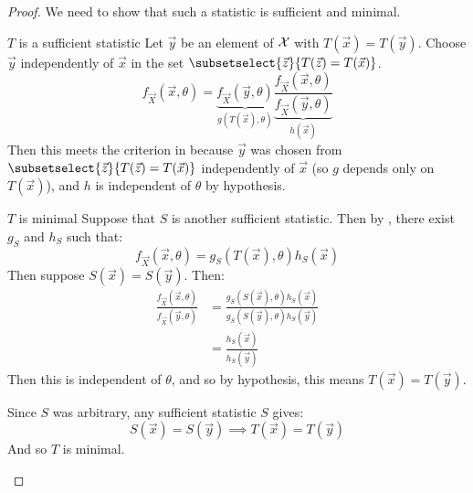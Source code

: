 \documentclass[../Main.tex]{subfiles}
\begin{document}
\begin{proof}
    We need to show that such a statistic is sufficient and minimal.
    \begin{subproof}{$T$ is a sufficient statistic}
        Let $\vec{y}$ be an element of $\mathcal{X}$ with $T(\vec{x}) = T(\vec{y})$. Choose $\vec{y}$ independently of $\vec{x}$ in the set $\subsetselect{\vec{z}}{T(\vec{z}) = T(\vec{x})}$.
        \begin{equation*}
            f_{\vec{X}}(\vec{x}, \theta) = \underbrace{f_{\vec{X}}(\vec{y}, \theta)}_{g(T(\vec{x}), \theta)} \underbrace{\frac{f_{\vec{X}}(\vec{x}, \theta)}{f_{\vec{X}}(\vec{y}, \theta)}}_{h(\vec{x})}
        \end{equation*}
        Then this meets the criterion in  because $\vec{y}$ was chosen from $\subsetselect{\vec{z}}{T(\vec{z}) = T(\vec{x})}$ independently of $\vec{x}$ (so $g$ depends only on $T(\vec{x})$), and $h$ is independent of $\theta$ by hypothesis.
    \end{subproof}
    \begin{subproof}{$T$ is minimal}
        Suppose that $S$ is another sufficient statistic. Then by , there exist $g_S$ and $h_S$ such that:
        \begin{equation*}
            f_{\vec{X}}(\vec{x}, \theta) = g_S(T(\vec{x}), \theta) h_S(\vec{x})
        \end{equation*}
        Then suppose $S(\vec{x}) = S(\vec{y})$. Then:
        \begin{align*}
            \frac{f_{\vec{X}}(\vec{x}, \theta)}{f_{\vec{X}}(\vec{y}, \theta)}&= \frac{g_S(S(\vec{x}), \theta) h_S(\vec{x})}{g_S(S(\vec{y}), \theta) h_S(\vec{y})} \\
            &= \frac{h_S(\vec{x})}{h_S(\vec{y})}
        \end{align*}
        Then this is independent of $\theta$, and so by hypothesis, this means $T(\vec{x}) = T(\vec{y})$.

        Since $S$ was arbitrary, any sufficient statistic $S$ gives:
        \begin{equation*}
            S(\vec{x}) = S(\vec{y}) \implies T(\vec{x}) = T(\vec{y})
        \end{equation*}
        And so $T$ is minimal.
    \end{subproof}
\end{proof}
\end{document}
